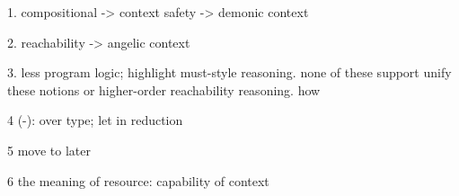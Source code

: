 1. compositional -> context
   safety -> demonic context

2. reachability -> angelic context

3. less program logic; highlight must-style reasoning. none of these support unify these notions or higher-order reachability reasoning. how 

4 (-): over type; let in reduction 

5 move to later 

6 the meaning of resource: capability of context